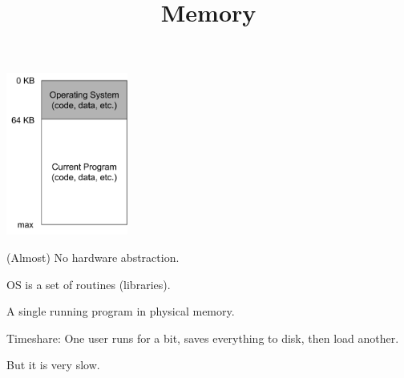 

\title{Memory}



\begin{frame}
    \titlepage
\end{frame}

\begin{slide}


    \begin{minipage}{0.3\textwidth}
        \includegraphics[width=40mm]{early-os-mem.png}
    \end{minipage}
    \hfill
    \begin{minipage}{0.65\textwidth}
        (Almost) No hardware abstraction.
        \bigskip

        OS is a set of routines (libraries).
        \bigskip

        A single running program in physical memory.
    \end{minipage}

\end{slide}

\begin{slide}


    Timeshare: One user runs for a bit, saves everything to disk, then load another.
    \bigskip

    But it is very slow.

\end{slide}

